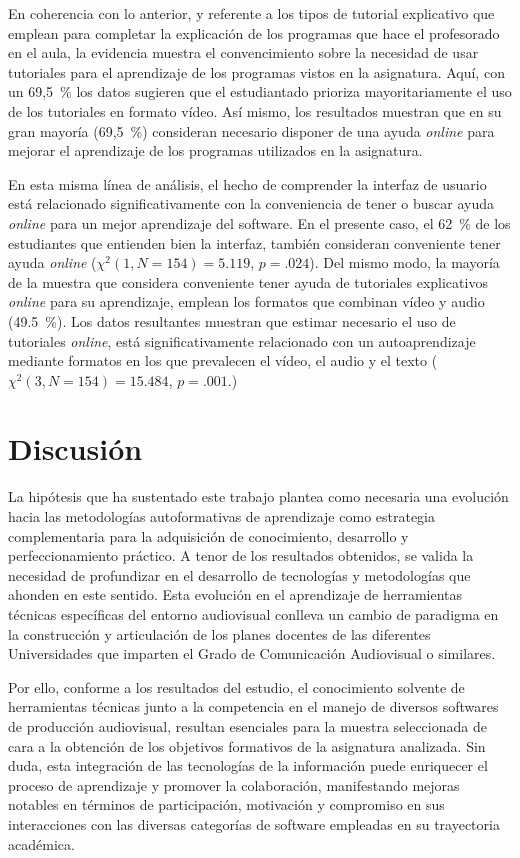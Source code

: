 \documentclass[spanish]{textolivre}
\begin{document}
En coherencia con lo anterior, y referente a los tipos de tutorial explicativo que emplean para completar la explicación de los programas que hace el profesorado en el aula, la evidencia muestra el convencimiento sobre la necesidad de usar tutoriales para el aprendizaje de los programas vistos en la asignatura. Aquí, con un 69,5~\% los datos sugieren que el estudiantado prioriza mayoritariamente el uso de los tutoriales en formato vídeo. Así mismo, los resultados muestran que en su gran mayoría (69,5~\%) consideran necesario disponer de una ayuda \textit{online} para mejorar el aprendizaje de los programas utilizados en la asignatura. 

En esta misma línea de análisis, el hecho de comprender la interfaz de usuario está relacionado significativamente con la conveniencia de tener o buscar ayuda \textit{online} para un mejor aprendizaje del software. En el presente caso, el 62~\% de los estudiantes que entienden bien la interfaz, también consideran conveniente tener ayuda \textit{online} ($\chi^{2}(1,N=154)=5.119$, $p=.024$). Del mismo modo, la mayoría de la muestra que considera conveniente tener ayuda de tutoriales explicativos \textit{online} para su aprendizaje, emplean los formatos que combinan vídeo y audio (49.5~\%). Los datos resultantes muestran que estimar necesario el uso de tutoriales \textit{online}, está significativamente relacionado con un autoaprendizaje mediante formatos en los que prevalecen el vídeo, el audio y el texto ($\chi^{2}(3,N=154)=15.484$, $p=.001$.)

\section{Discusión}\label{sec-format-simple}
La hipótesis que ha sustentado este trabajo plantea como necesaria una evolución hacia las metodologías autoformativas de aprendizaje como estrategia complementaria para la adquisición de conocimiento, desarrollo y perfeccionamiento práctico. A tenor de los resultados obtenidos, se valida la necesidad de profundizar en el desarrollo de tecnologías y metodologías que ahonden en este sentido. Esta evolución en el aprendizaje de herramientas técnicas específicas del entorno audiovisual conlleva un cambio de paradigma en la construcción y articulación de los planes docentes de las diferentes Universidades que imparten el Grado de Comunicación Audiovisual o similares.

Por ello, conforme a los resultados del estudio, el conocimiento solvente de herramientas técnicas junto a la competencia en el manejo de diversos softwares de producción audiovisual, resultan esenciales para la muestra seleccionada de cara a la obtención de los objetivos formativos de la asignatura analizada. Sin duda, esta integración de las tecnologías de la información puede enriquecer el proceso de aprendizaje y promover la colaboración, manifestando mejoras notables en términos de participación, motivación y compromiso en sus interacciones con las diversas categorías de software empleadas en su trayectoria académica.
\end{document}
